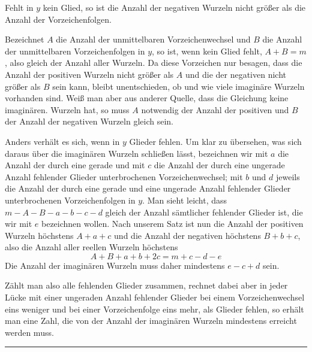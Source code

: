 Fehlt in $y$ kein Glied, so ist die Anzahl der negativen Wurzeln nicht größer als die Anzahl der Vorzeichenfolgen.

Bezeichnet $A$ die Anzahl der unmittelbaren Vorzeichenwechsel und $B$ die Anzahl der unmittelbaren Vorzeichenfolgen in $y$, so ist, wenn kein Glied fehlt, $A+B=m$, also gleich der Anzahl aller Wurzeln. Da diese Vorzeichen nur besagen, dass die Anzahl der positiven Wurzeln nicht größer als $A$ und die der negativen nicht größer als $B$ sein kann, bleibt unentschieden, ob und wie viele imaginäre Wurzeln vorhanden sind. Weiß man aber aus anderer Quelle, dass die Gleichung keine imaginären. Wurzeln hat, so muss $A$ notwendig der Anzahl der positiven und $B$ der Anzahl der negativen Wurzeln gleich sein.

Anders verhält es sich, wenn in $y$ Glieder fehlen. Um klar
zu übersehen, was sich daraus über die imaginären Wurzeln schließen lässt, bezeichnen wir mit $a$ die Anzahl der durch eine gerade und mit $c$ die Anzahl der durch eine ungerade Anzahl fehlender Glieder unterbrochenen Vorzeichenwechsel; mit $b$ und $d$ jeweils die Anzahl der durch eine gerade und eine ungerade Anzahl fehlender Glieder unterbrochenen Vorzeichenfolgen in $y$. Man sieht leicht, dass $m-A-B-a-b-c-d$ gleich der Anzahl sämtlicher fehlender Glieder ist, die wir mit $e$ bezeichnen wollen. Nach unserem Satz ist nun die Anzahl der positiven Wurzeln höchstens $A+a+c$ und die Anzahl der negativen höchstens $B+b+c$, also die Anzahl aller reellen Wurzeln höchstens
\[
A+B+a+b+2c=m+c-d-e
\]
Die Anzahl der imaginären Wurzeln muss daher mindestens $e-c+d$ sein.

Zählt man also alle fehlenden Glieder zusammen, rechnet dabei aber in jeder Lücke mit einer ungeraden Anzahl fehlender Glieder bei einem Vorzeichenwechsel eins weniger und bei einer Vorzeichenfolge eins mehr, als Glieder fehlen, so erhält man eine Zahl, die von der Anzahl der imaginären Wurzeln mindestens erreicht werden muss.
\begin{center}\rule{0.28\linewidth}{0.4pt}\end{center}

